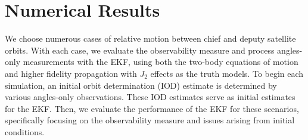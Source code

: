 \documentclass[letterpaper, paper,10pt]{AAS}		%
\newcommand{\braces}[1]{\ensuremath{\left\{ #1 \right\}}}
\renewcommand{\Re}{\ensuremath{\mathbb{R}}}
\begin{document}
%
%
%


\section{Numerical Results}

We choose numerous cases of relative motion between chief and deputy satellite orbits.
With each case, we evaluate the observability measure and process angles-only measurements with the EKF, using both the two-body equations of motion and higher fidelity propagation with $J_2$ effects as the truth models.
To begin each simulation, an initial orbit determination (IOD) estimate is determined by various angles-only observations.
These IOD estimates serve as initial estimates for the EKF.
Then, we evaluate the performance of the EKF for these scenarios, specifically focusing on the observability measure and issues arising from initial conditions.
\end{document}

